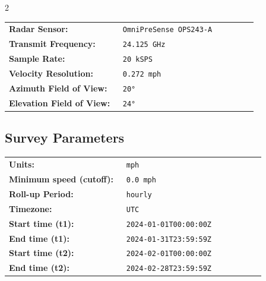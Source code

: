 \documentclass[10pt,letterpaper]{article}
\begin{document}
\begin{multicols}{2}
{
\small
\setlength{\tabcolsep}{2pt}
\renewcommand{\arraystretch}{1.00}
\begin{tabular}{>{\raggedright\arraybackslash\bfseries}p{0.44\linewidth}>{\raggedright\arraybackslash}p{0.52\linewidth}}
Radar Sensor: & \texttt{OmniPreSense OPS243-A} \\

Transmit Frequency: & \texttt{24.125 GHz} \\
Sample Rate: & \texttt{20 kSPS} \\
Velocity Resolution: & \texttt{0.272 mph} \\
Azimuth Field of View: & \texttt{20°} \\
Elevation Field of View: & \texttt{24°} \\
\end{tabular}
}

\subsection*{Survey Parameters}

{
\small
\setlength{\tabcolsep}{2pt}
\renewcommand{\arraystretch}{1.00}
\begin{tabular}{>{\raggedright\arraybackslash\bfseries}p{0.44\linewidth}>{\raggedright\arraybackslash}p{0.52\linewidth}}
Units: & \texttt{mph} \\
Minimum speed (cutoff): & \texttt{0.0 mph} \\
Roll-up Period: & \texttt{hourly} \\
Timezone: & \texttt{UTC} \\
Start time (t1): & \texttt{2024-01-01T00:00:00Z} \\
End time (t1): & \texttt{2024-01-31T23:59:59Z} \\
Start time (t2): & \texttt{2024-02-01T00:00:00Z} \\
End time (t2): & \texttt{2024-02-28T23:59:59Z} \\


\end{tabular}
}









\end{multicols}
\end{document}
